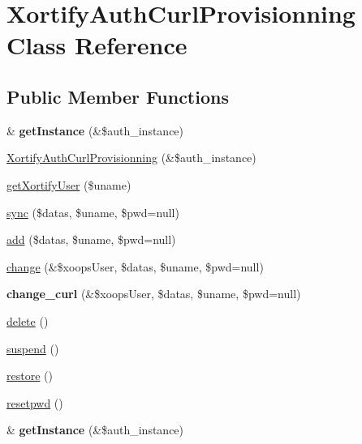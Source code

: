 \hypertarget{class_xortify_auth_curl_provisionning}{\section{Xortify\-Auth\-Curl\-Provisionning Class Reference}
\label{class_xortify_auth_curl_provisionning}
}
\subsection*{Public Member Functions}
\begin{DoxyCompactItemize}
\item 
\hypertarget{class_xortify_auth_curl_provisionning_a2c8eaa915c70d75289ac8a03686194f9}{\& {\bfseries get\-Instance} (\&\$auth\-\_\-instance)}\label{class_xortify_auth_curl_provisionning_a2c8eaa915c70d75289ac8a03686194f9}

\item 
\hyperlink{class_xortify_auth_curl_provisionning_ae3322c493c27ac523093137bf532b541}{Xortify\-Auth\-Curl\-Provisionning} (\&\$auth\-\_\-instance)
\item 
\hyperlink{class_xortify_auth_curl_provisionning_a041d726ac26672547ed1504e8e0117aa}{get\-Xortify\-User} (\$uname)
\item 
\hyperlink{class_xortify_auth_curl_provisionning_a35dc08b0f2138eb818ff95345b73bcff}{sync} (\$datas, \$uname, \$pwd=null)
\item 
\hyperlink{class_xortify_auth_curl_provisionning_adfc9fcef01e7bd7b2f47e8e79d51fc63}{add} (\$datas, \$uname, \$pwd=null)
\item 
\hyperlink{class_xortify_auth_curl_provisionning_ae1f0971b9712c794620cf309164e43af}{change} (\&\$xoops\-User, \$datas, \$uname, \$pwd=null)
\item 
\hypertarget{class_xortify_auth_curl_provisionning_aba6f598c234d191a3b3934f90b35fd9f}{{\bfseries change\-\_\-curl} (\&\$xoops\-User, \$datas, \$uname, \$pwd=null)}\label{class_xortify_auth_curl_provisionning_aba6f598c234d191a3b3934f90b35fd9f}

\item 
\hyperlink{class_xortify_auth_curl_provisionning_a13bdffdd926f26b825ea57066334ff01}{delete} ()
\item 
\hyperlink{class_xortify_auth_curl_provisionning_ad73006a505121228f3b075c2409787d2}{suspend} ()
\item 
\hyperlink{class_xortify_auth_curl_provisionning_aa1371f22826cf8cde4454c9b467203d0}{restore} ()
\item 
\hyperlink{class_xortify_auth_curl_provisionning_a06d70fbd3a2db390b6f2530c0076628e}{resetpwd} ()
\item 
\hypertarget{class_xortify_auth_curl_provisionning_a2c8eaa915c70d75289ac8a03686194f9}{\& {\bfseries get\-Instance} (\&\$auth\-\_\-instance)}\label{class_xortify_auth_curl_provisionning_a2c8eaa915c70d75289ac8a03686194f9}


\end{DoxyCompactItemize}

